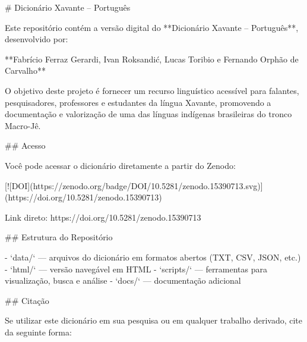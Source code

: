 # Dicionário Xavante – Português

Este repositório contém a versão digital do **Dicionário Xavante – Português**, desenvolvido por:

**Fabrício Ferraz Gerardi, Ivan Roksandić, Lucas Toribio e Fernando Orphão de Carvalho**

O objetivo deste projeto é fornecer um recurso linguístico acessível para falantes, pesquisadores, professores e estudantes da língua Xavante, promovendo a documentação e valorização de uma das línguas indígenas brasileiras do tronco Macro-Jê.

## Acesso

Você pode acessar o dicionário diretamente a partir do Zenodo:

[![DOI](https://zenodo.org/badge/DOI/10.5281/zenodo.15390713.svg)](https://doi.org/10.5281/zenodo.15390713)

Link direto: https://doi.org/10.5281/zenodo.15390713

## Estrutura do Repositório

- `data/` — arquivos do dicionário em formatos abertos (TXT, CSV, JSON, etc.)
- `html/` — versão navegável em HTML
- `scripts/` — ferramentas para visualização, busca e análise
- `docs/` — documentação adicional

## Citação

Se utilizar este dicionário em sua pesquisa ou em qualquer trabalho derivado, cite da seguinte forma:
